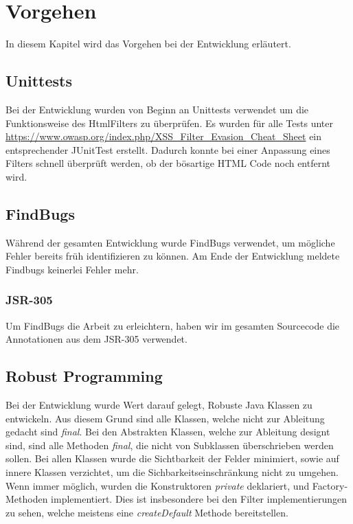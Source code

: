 \section{Vorgehen}

In diesem Kapitel wird das Vorgehen bei der Entwicklung erläutert.

\subsection{Unittests}

Bei der Entwicklung wurden von Beginn an Unittests verwendet um die Funktionsweise des HtmlFilters zu überprüfen.
Es wurden für alle Tests unter \url{https://www.owasp.org/index.php/XSS_Filter_Evasion_Cheat_Sheet} ein entsprechender JUnitTest erstellt.
Dadurch konnte bei einer Anpassung eines Filters schnell überprüft werden, ob der bösartige HTML Code noch entfernt wird.

\subsection{FindBugs}

Während der gesamten Entwicklung wurde FindBugs verwendet, um mögliche Fehler bereits 
früh identifizieren zu können. Am Ende der Entwicklung meldete Findbugs keinerlei Fehler mehr.

\subsubsection{JSR-305}

Um FindBugs die Arbeit zu erleichtern, haben wir im gesamten Sourcecode die Annotationen aus dem JSR-305 
verwendet.
\subsection{Robust Programming}

Bei der Entwicklung wurde Wert darauf gelegt, Robuste Java Klassen zu entwickeln. Aus diesem Grund 
sind alle Klassen, welche nicht zur Ableitung gedacht sind \textit{final}. Bei den Abstrakten Klassen,
welche zur Ableitung designt sind, sind alle Methoden \textit{final}, die nicht von Subklassen überschrieben
werden sollen. Bei allen Klassen wurde die Sichtbarkeit der Felder minimiert, sowie auf innere Klassen 
verzichtet, um die Sichbarkeitseinschränkung nicht zu umgehen. Wenn immer möglich, wurden die 
Konstruktoren \textit{private} deklariert, und Factory-Methoden implementiert. Dies ist insbesondere
bei den Filter implementierungen zu sehen, welche meistens eine \textit{createDefault} Methode 
bereitstellen.\newline

